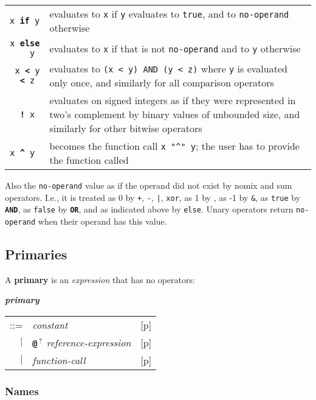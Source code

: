 \documentclass[12pt]{article}
\newcommand{\TT}[1]{{\tt \bfseries #1}}
\newcommand{\QMARK}{{$^{\,\mbox{\footnotesize ?}}$}}
\newcommand{\key}[1]{{\rm \bfseries #1}}
\newcommand{\emkey}[1]{{\em \bfseries #1}}
\newcommand{\pagref}[1]{p\pageref{#1}}
\newenvironment{indpar}[1][0.3in]%
	{\begin{list}{}%
		     {\setlength{\itemsep}{0in}%
		      \setlength{\topsep}{0in}%
		      \setlength{\parsep}{1ex}%
		      \setlength{\labelwidth}{#1}%
		      \setlength{\leftmargin}{#1}%
		      \addtolength{\leftmargin}{\labelsep}}%
	 \item}%
	{\end{list}}
\begin{document}
\begin{indpar}
\begin{tabular}{rp{5.0in}}
\tt x \TT{if} y & evaluates to {\tt x} if {\tt y} evaluates to {\tt true},
                  and to {\tt no-operand} otherwise
\\[0.5ex]
\tt x \TT{else} y & evaluates to {\tt x} if that is not {\tt no-operand}
                  and to {\tt y} otherwise
\\[0.5ex]
\tt x \TT{<} y \TT{<} z & evaluates to {\tt (x < y) AND (y < z)} where
                  {\tt y} is evaluated only once, and similarly for
		  all comparison operators
\\[0.5ex]
\tt \TT{!} x & evaluates on signed integers as if they were represented
               in two's complement by binary values of unbounded size,
	       and similarly for other bitwise operators
\\[0.5ex]
\tt x \TT{\textasciicircum} y
	& becomes the function call {\tt x~"\textasciicircum"~y}; the
	  user has to provide the function called
\end{tabular}
\end{indpar}

Also the {\tt no-operand} value as if the operand did not exist
by nomix and sum operators.  I.e., it is treated as
0 by {\tt +}, {\tt -}, {\tt |}, {\tt xor},
as 1 by {\tt *},
as -1 by {\tt \&},
as {\tt true} by \TT{AND},
as {\tt false} by \TT{OR},
and as indicated above by {\tt else}.
Unary operators return {\tt no-operand} when their operand
has this value.

\subsection{Primaries}

A \key{primary} is an {\em expression} that has no operators:
\begin{indpar}
\emkey{primary}
    \begin{tabular}[t]{@{}rll}
    ::= & {\em constant}		& [\pagref{CONSTANTS}] \\
    $|$ & \TT{@}\QMARK{} {\em reference-expression}
                                        & [\pagref{REFERENCE-EXPRESSIONS}] \\
    $|$ & {\em function-call}		& [\pagref{FUNCTION-CALLS}] \\
    \end{tabular}
\end{indpar}

\subsubsection{Names}
\label{NAMES}
\end{document}
